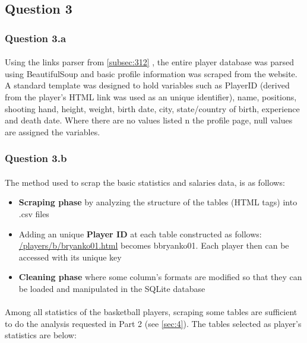 
\subsection{Question 3}
\label{subsec:313}

\subsubsection{Question 3.a}
\label{subsubsec:313a}
\paragraph{}Using the links parser from \ref{subsec:312}	, the entire player database was parsed using BeautifulSoup and basic profile information was scraped from the website. A standard template was designed to hold variables such as PlayerID (derived from the player’s HTML link was used as an unique identifier), name, positions, shooting hand, height, weight, birth date, city, state/country of birth, experience and death date. Where there are no values listed n the profile page, null values are assigned the variables.

\subsubsection{Question 3.b}
\label{subsubsec:313b}

\paragraph{}The method used to scrap the basic statistics and salaries data, is as follows:

\begin{itemize}
	\item \textbf{Scraping phase} by analyzing the structure of the tables (HTML tags) into .csv files
	\item Adding an unique \textbf{Player ID} at each table constructed as follows: \url{/players/b/bryanko01.html} becomes bbryanko01. Each player then can be accessed with its unique key
	\item \textbf{Cleaning phase} where some column's formats are modified so that they can be loaded and manipulated in the SQLite database
\end{itemize}

\paragraph{}Among all statistics of the basketball players, scraping some tables are sufficient to do the analysis requested in Part 2 (see \ref{sec:4}). The tables selected as player's statistics are below:

